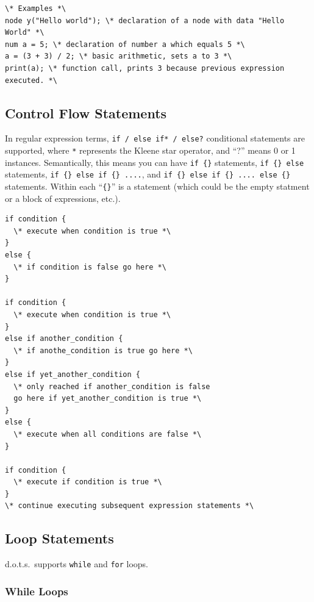 \documentclass{article}
\newcommand{\pltlang}{d.o.t.s.} %
\newcommand{\code}[1]{\texttt{#1}} %
\begin{document}
\begin{lstlisting}[language=pltLang, label=lst:expression-statements]
\* Examples *\
node y("Hello world"); \* declaration of a node with data "Hello World" *\
num a = 5; \* declaration of number a which equals 5 *\
a = (3 + 3) / 2; \* basic arithmetic, sets a to 3 *\
print(a); \* function call, prints 3 because previous expression executed. *\

\end{lstlisting}

\subsection{Control Flow Statements}
In regular expression terms, \code{if / else if* / else?} conditional statements are supported, where \code{*} represents the Kleene star operator, and ``?'' means 0 or 1 instances. Semantically, this means you can have \code{if \{\}} statements, \code{if \{\} else} statements, \code{if \{\} else if \{\} ....}, and \code{if \{\} else if \{\} .... else \{\}} statements. Within each ``\code{\{\}}'' is a statement (which could be the empty statment or a block of expressions, etc.).

\begin{lstlisting}[language=pltLang, label=lst:if-else]
if condition {
  \* execute when condition is true *\
}
else {
  \* if condition is false go here *\
}

if condition {
  \* execute when condition is true *\
}
else if another_condition {
  \* if anothe_condition is true go here *\
}
else if yet_another_condition {
  \* only reached if another_condition is false
  go here if yet_another_condition is true *\
}
else {
  \* execute when all conditions are false *\
}

if condition {
  \* execute if condition is true *\
}
\* continue executing subsequent expression statements *\

\end{lstlisting}

\subsection{Loop Statements}
\pltlang\ supports \code{while} and \code{for} loops.

\subsubsection{While Loops}
\end{document}
